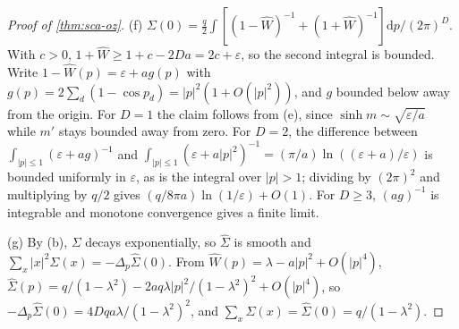 \begin{proof}[Proof of \cref{thm:sca-oz}]
(f) $\Sigma(0)=\frac q2\int[(1-\hat W)^{-1}+(1+\hat W)^{-1}]\mathrm{d}p/(2\pi)^D$. With $c>0$, $1+\hat W\ge1+c-2Da=2c+\varepsilon$, so the second integral is bounded. Write $1-\hat W(p)=\varepsilon+ag(p)$ with $g(p)=2\sum_d(1-\cos p_d)=|p|^2(1+O(|p|^2))$, and $g$ bounded below away from the origin. For $D=1$ the claim follows from (e), since $\sinh m\sim\sqrt{\varepsilon/a}$ while $m'$ stays bounded away from zero. For $D=2$, the difference between $\int_{|p|\le1}(\varepsilon+ag)^{-1}$ and $\int_{|p|\le1}(\varepsilon+a|p|^2)^{-1}=(\pi/a)\ln((\varepsilon+a)/\varepsilon)$ is bounded uniformly in $\varepsilon$, as is the integral over $|p|>1$; dividing by $(2\pi)^2$ and multiplying by $q/2$ gives $(q/8\pi a)\ln(1/\varepsilon)+O(1)$. For $D\ge3$, $(ag)^{-1}$ is integrable and monotone convergence gives a finite limit.

(g) By (b), $\Sigma$ decays exponentially, so $\hat\Sigma$ is smooth and $\sum_x|x|^2\Sigma(x)=-\Delta_p\hat\Sigma(0)$. From $\hat W(p)=\lambda-a|p|^2+O(|p|^4)$, $\hat\Sigma(p)=q/(1-\lambda^2)-2aq\lambda|p|^2/(1-\lambda^2)^2+O(|p|^4)$, so $-\Delta_p\hat\Sigma(0)=4Dqa\lambda/(1-\lambda^2)^2$, and $\sum_x\Sigma(x)=\hat\Sigma(0)=q/(1-\lambda^2)$.
\end{proof}

